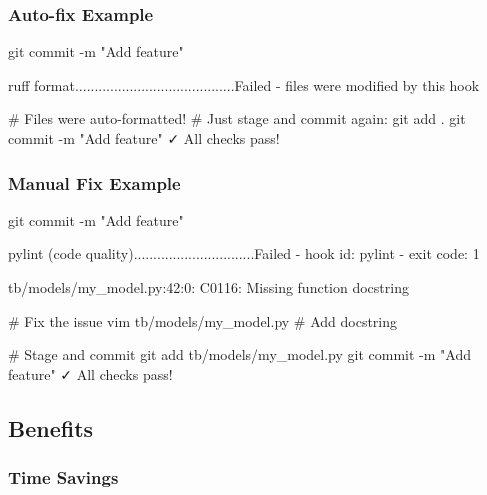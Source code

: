 \subsubsection{Auto-fix Example}\label{cr:app:archive-pre-commit-setup-summary:auto-fix-example}

\begin{record}

\begin{textblock}
git commit -m "Add feature"

ruff format.........................................Failed
- files were modified by this hook

# Files were auto-formatted!
# Just stage and commit again:
git add .
git commit -m "Add feature"
✓ All checks pass!
\end{textblock}

\end{record}

\subsubsection{Manual Fix Example}\label{cr:app:archive-pre-commit-setup-summary:manual-fix-example}

\begin{record}

\begin{textblock}
git commit -m "Add feature"

pylint (code quality)...............................Failed
- hook id: pylint
- exit code: 1

tb/models/my_model.py:42:0: C0116: Missing function docstring

# Fix the issue
vim tb/models/my_model.py  # Add docstring

# Stage and commit
git add tb/models/my_model.py
git commit -m "Add feature"
✓ All checks pass!
\end{textblock}

\end{record}

\subsection{Benefits}\label{cr:app:archive-pre-commit-setup-summary:benefits}

\subsubsection{Time Savings}\label{cr:app:archive-pre-commit-setup-summary:time-savings}

